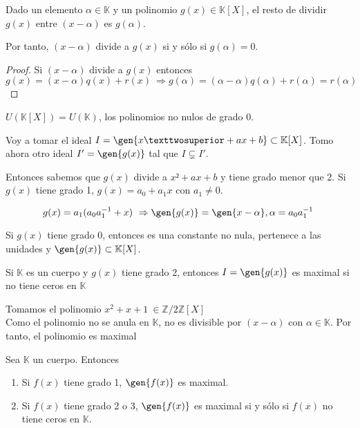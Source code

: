 \documentclass[nochap]{apuntes}
\begin{document}
\begin{theorem}
Dado un elemento $\alpha \in \mathbb{K}$  y un polinomio $g(x)\in \mathbb{K}[X]$, el resto de dividir $g(x)$ entre $(x-\alpha)$ es $g(\alpha)$.

Por tanto, $(x-\alpha)$ divide a $g(x)$ si y sólo si $g(\alpha)=0$.
\end{theorem}

\begin{proof}
 Si $(x-\alpha)$ divide a $g(x)$ entonces \[ g(x)=(x-\alpha)q(x)+r(x) \ \Rightarrow g(\alpha)=(\alpha-\alpha)q(\alpha)+r(\alpha)=r(\alpha) \]
\end{proof}

\obs $U(\mathbb{K}[X])=U(\mathbb{K})$, los polinomios no nulos de grado 0.

\begin{example}
 Voy a tomar el ideal $I=\gen{x²+ax+b}\subset \mathbb{K}[X]$. Tomo ahora otro ideal $I'=\gen{g(x)}$ tal que $I\varsubsetneq I'$.
 
 Entonces sabemos que $g(x)$ divide a $x²+ax+b$  y tiene grado menor que 2. Si $g(x)$ tiene grado 1, $g(x)=a_0+a_1 x$  con $a_1\neq 0$.
 
 \[ g(x)= a_1(a_0a_1^{-1}+x) \ \Rightarrow \gen{g(x)}=\gen{x-\alpha},\alpha=a_0a_1^{-1} \]
 
 Si $g(x)$ tiene grado 0, entonces es una constante no nula, pertenece a las unidades y $\gen{g(x)} \subset \mathbb{K}[X]$.
\end{example}

\begin{lemma}
 Si $\mathbb{K}$  es un cuerpo y $g(x)$ tiene grado 2, entonces $I=\gen{g(x)}$ es maximal si no tiene ceros en $\mathbb{K}$
\end{lemma}

\begin{example}
 Tomamos el polinomio $x^2+x+1 \ \in \mathbb{Z}/2\mathbb{Z}[X]$\\
 Como el polinomio no se anula en $\mathbb{K}$, no es divisible por $(x-\alpha)$ con $\alpha \in \mathbb{K}$. Por tanto, el polinomio es maximal
\end{example}

\begin{theorem}
 Sea $\mathbb{K}$  un cuerpo. Entonces
 \begin{enumerate}
  \item Si $f(x)$ tiene grado 1,  $\gen{f(x)}$ es maximal.
  \item Si $f(x)$ tiene grado 2 o 3, $\gen{f(x)}$ es maximal si y sólo si $f(x)$ no tiene ceros en $\mathbb{K}$.
 \end{enumerate}
\end{theorem}
\end{document}
